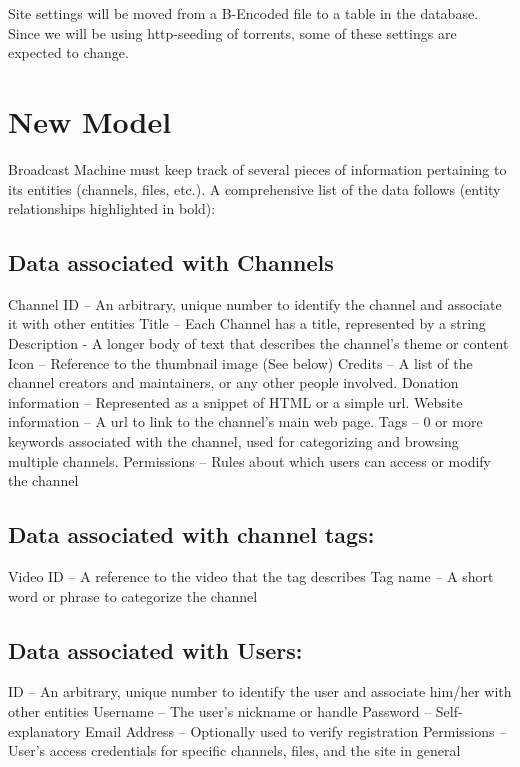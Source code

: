 \documentclass[a4paper,12pt]{report}
\begin{document}
	Site settings will be moved from a B-Encoded file to a table in the database. Since we will be using http-seeding of torrents, some of these settings are expected to change.

\section{New Model}
Broadcast Machine must keep track of several pieces of information pertaining to its entities (channels, files, etc.).
A comprehensive list of the data follows (entity relationships highlighted in bold):

\subsection{Data associated with Channels}
Channel ID – An arbitrary, unique number to identify the channel and  associate it with other entities
Title – Each Channel has a title, represented by a string
Description - A longer body of text that describes the channel's theme or content
Icon – Reference to the thumbnail image (See below)
Credits – A list of the channel creators and maintainers, or any other people involved.
Donation information – Represented as a snippet of HTML or a simple url.
Website information – A url to link to the channel's main web page.
Tags – 0 or more keywords associated with the channel, used for categorizing and browsing multiple channels.
Permissions – Rules about which users can access or modify the channel

\subsection{Data associated with channel tags:}
Video ID – A reference to the video that the tag describes
Tag name – A short word or phrase to categorize the channel

\subsection{Data associated with Users:}
ID – An arbitrary, unique number to identify the user and associate him/her with other entities
Username – The user's nickname or handle
Password – Self-explanatory
Email Address – Optionally used to verify registration
Permissions – User's access credentials for specific channels, files, and the site in general
\end{document}
